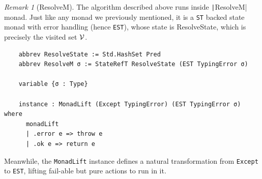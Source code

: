 \documentclass[a4paper, 11pt]{article}
\theoremstyle{remark}\newtheorem*{remark}{Remark}
\theoremstyle{definition}\newtheorem*{definition}{Definition}
\begin{document}
\begin{remark}[\textsf{ResolveM}]
The algorithm described above runs inside \texttt|ResolveM| monad.
Just like any monad we previously mentioned, it is a \texttt{ST} backed state monad
with error handling (hence \texttt{EST}), whose state is
\textsf{ResolveState}, which is precisely the visited set $\mathcal{V}$.
  \begin{verbatim}
    abbrev ResolveState := Std.HashSet Pred
    abbrev ResolveM σ := StateRefT ResolveState (EST TypingError σ)

    variable {σ : Type}

    instance : MonadLift (Except TypingError) (EST TypingError σ) where
      monadLift
      | .error e => throw e
      | .ok e => return e
  \end{verbatim}
Meanwhile, the \texttt{MonadLift} instance defines a natural transformation from \texttt{Except} to
\texttt{EST}, lifting fail-able but pure actions to run in it.

\end{remark}
\end{document}
